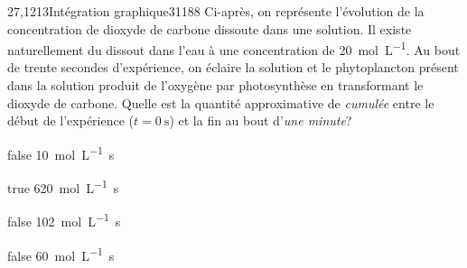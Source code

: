 \documentclass[11pt]{article}
\begin{document}
		\begin{question}{27,1213}{Intégration graphique}{3}{1188}
             Ci-après, on représente l'évolution de la concentration de dioxyde de carbone dissoute dans une solution. Il existe naturellement du  dissout dans l'eau à une concentration de \SI{20}{\mol\per\liter}. Au bout de trente secondes d'expérience, on éclaire la solution et le phytoplancton présent dans la solution produit de l'oxygène par photosynthèse en transformant le dioxyde de carbone. Quelle est la quantité approximative de  \emph{cumulée} entre le début de l'expérience ($t=\SI{0}{\second}$) et la fin au bout d'\emph{une minute}?
            \begin{figure}
             \end{figure}
        \end{question}
        \begin{reponses}
            \item[false] \SI{10}{\mol\per\liter.\second}
		    \item[true] \SI{620}{\mol\per\liter.\second}
		    \item[false] \SI{102}{\mol\per\liter.\second}
		    \item[false] \SI{60}{\mol\per\liter.\second}
		    \end{reponses}
		
\end{document}
